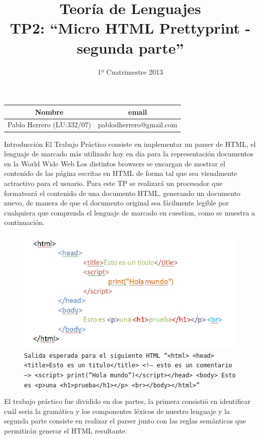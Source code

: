 \documentclass[a4paper,8pt]{article}
\title{Teoría de Lenguajes\\ \textbf{TP2: “Micro HTML Prettyprint - segunda parte”}}
\author{1º Cuatrimestre 2013}
\date{}
\begin{document}
\maketitle

\begin{center}
\vspace{10cm}

\begin{tabular}{|c|c|}
\hline
\hline
\textbf{Nombre}&\textbf{email}\\
\hline
\hline
Pablo Herrero (LU:332/07)   & pablodherrero@gmail.com   \\
\hline
\hline
\end{tabular}
\end{center}

\newpage

\begin{section}{Introducción}
El Trabajo Práctico consiste en implementar un parser de HTML, el lenguaje de marcado más utilizado hoy en dia para la representación documentos en la World Wide Web
Los distintos browsers se encargan de mostrar el contenido de las página escritas en HTML de forma tal que sea visualmente actractivo para el usuario.
Para este TP se realizará un procesador que formateará el contenido de una documento HTML, generando un documento nuevo, de manera de que el documento original sea fácilmente legible por cualquiera que comprenda el lenguaje de marcado en cuestion, como se muestra a continuación.

\begin{figure}[h!]
  \centering
  \includegraphics[scale=0.70]{salida.png}
  \caption{\texttt{Salida esperada para el siguiente HTML ``$<html> <head><title>$Esto es un titulo$</title> <!–$ esto es un comentario $–> <script> print($”Hola mundo”$)</script></head> <body>$ Esto es $<p>$una $<h1>$prueba$</h1></p> <br></body></html>$''}}
\end{figure}

El trabajo práctico fue dividido en dos partes, la primera consistió en identificar cuál seria la gramática y los componentes léxicos de nuestro lenguaje y la segunda parte consiste en realizar el parser junto con las reglas semánticas que permitirán generar el HTML resultante.
 


\end{section}
\end{document}

